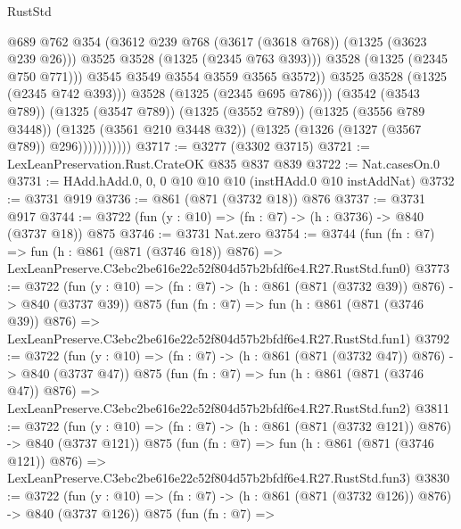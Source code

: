 \begin{lexlean}{RustStd}
\begin{coremodule}
                                  @689
                                  @762
                                  @354
                                  (@3612 @239 @768 (@3617 (@3618 @768)) (@1325 (@3623 @239 @26)))
                                  @3525
                                  @3528
                                  (@1325 (@2345 @763 @393)))
                                @3528
                                (@1325 (@2345 @750 @771)))
                              @3545
                              @3549
                              @3554
                              @3559
                              @3565
                              @3572))
                          @3525
                          @3528
                          (@1325 (@2345 @742 @393)))
                        @3528
                        (@1325 (@2345 @695 @786)))
                      (@3542 (@3543 @789))
                      (@1325 (@3547 @789))
                      (@1325 (@3552 @789))
                      (@1325 (@3556 @789 @3448))
                      (@1325 (@3561 @210 @3448 @32))
                      (@1325 (@1326 (@1327 (@3567 @789)) @296)))))))))))
@3717 := @3277 (@3302 @3715)
@3721 := LexLeanPreservation.Rust.CrateOK @835 @837 @839
@3722 := Nat.casesOn.{0}
@3731 := HAdd.hAdd.{0, 0, 0} @10 @10 @10 (instHAdd.{0} @10 instAddNat)
@3732 := @3731 @919
@3736 := @861 (@871 (@3732 @18)) @876
@3737 := @3731 @917
@3744 := @3722 (fun (y : @10) => (fn : @7) -> (h : @3736) -> @840 (@3737 @18)) @875
@3746 := @3731 Nat.zero
@3754 := @3744
    (fun (fn : @7) =>
    fun (h : @861 (@871 (@3746 @18)) @876) =>
    LexLeanPreserve.C3ebc2be616e22c52f804d57b2bfdf6e4.R27.RustStd.fun0)
@3773 := @3722
    (fun (y : @10) => (fn : @7) -> (h : @861 (@871 (@3732 @39)) @876) -> @840 (@3737 @39))
    @875
    (fun (fn : @7) =>
    fun (h : @861 (@871 (@3746 @39)) @876) =>
    LexLeanPreserve.C3ebc2be616e22c52f804d57b2bfdf6e4.R27.RustStd.fun1)
@3792 := @3722
    (fun (y : @10) => (fn : @7) -> (h : @861 (@871 (@3732 @47)) @876) -> @840 (@3737 @47))
    @875
    (fun (fn : @7) =>
    fun (h : @861 (@871 (@3746 @47)) @876) =>
    LexLeanPreserve.C3ebc2be616e22c52f804d57b2bfdf6e4.R27.RustStd.fun2)
@3811 := @3722
    (fun (y : @10) => (fn : @7) -> (h : @861 (@871 (@3732 @121)) @876) -> @840 (@3737 @121))
    @875
    (fun (fn : @7) =>
    fun (h : @861 (@871 (@3746 @121)) @876) =>
    LexLeanPreserve.C3ebc2be616e22c52f804d57b2bfdf6e4.R27.RustStd.fun3)
@3830 := @3722
    (fun (y : @10) => (fn : @7) -> (h : @861 (@871 (@3732 @126)) @876) -> @840 (@3737 @126))
    @875
    (fun (fn : @7) =>

\end{coremodule}
\end{lexlean}
